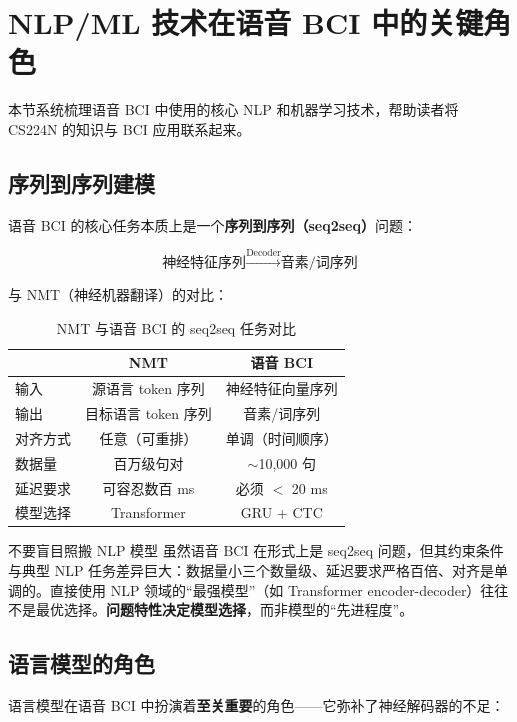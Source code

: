 \section{NLP/ML 技术在语音 BCI 中的关键角色}

本节系统梳理语音 BCI 中使用的核心 NLP 和机器学习技术，帮助读者将 CS224N 的知识与 BCI 应用联系起来。

\subsection{序列到序列建模}

语音 BCI 的核心任务本质上是一个\textbf{序列到序列（seq2seq）}问题：

$$\text{神经特征序列} \xrightarrow{\text{Decoder}} \text{音素/词序列}$$

与 NMT（神经机器翻译）的对比：

\begin{table}[H]
\centering
\begin{tabular}{lcc}
\toprule
& \textbf{NMT} & \textbf{语音 BCI} \\
\midrule
输入 & 源语言 token 序列 & 神经特征向量序列 \\
输出 & 目标语言 token 序列 & 音素/词序列 \\
对齐方式 & 任意（可重排） & 单调（时间顺序） \\
数据量 & 百万级句对 & $\sim$10,000 句 \\
延迟要求 & 可容忍数百 ms & 必须 $<$ 20 ms \\
模型选择 & Transformer & GRU + CTC \\
\bottomrule
\end{tabular}
\caption{NMT 与语音 BCI 的 seq2seq 任务对比}
\end{table}

\begin{warningbox}{不要盲目照搬 NLP 模型}
虽然语音 BCI 在形式上是 seq2seq 问题，但其约束条件与典型 NLP 任务差异巨大：数据量小三个数量级、延迟要求严格百倍、对齐是单调的。直接使用 NLP 领域的``最强模型''（如 Transformer encoder-decoder）往往不是最优选择。\textbf{问题特性决定模型选择}，而非模型的``先进程度''。
\end{warningbox}

\subsection{语言模型的角色}

语言模型在语音 BCI 中扮演着\textbf{至关重要}的角色——它弥补了神经解码器的不足：

